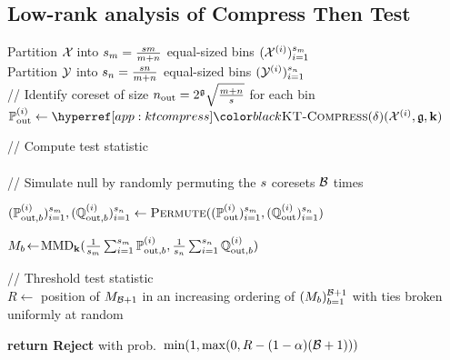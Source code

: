 \subsection{Low-rank analysis of Compress Then Test}
\begin{algorithm2e}[h]
\caption{\cttname (\ctt)}%
\label{algo:ctt}
\SetAlgoLined
  \DontPrintSemicolon
\small{
  \BlankLine
  Partition $\mathcal{X}_{}$ into $s_m =  \frac{s m}{m+n}$ equal-sized bins 
  $ ( \mathcal{X}_{}^{(i)} )_{i=1}^{s_m}$ \\
  Partition $\mathcal{Y}_{}$ into $s_n =  \frac{s n}{m+n}$ equal-sized bins 
  $ ( \mathcal{Y}_{}^{(i)} )_{i=1}^{s_n}$ \\
  
  \BlankLine
  // Identify coreset of size
  $n_{\textup{out}}=2^{\mathfrak{g}}\sqrt{\frac{m+n}{s}}$
  for each bin\\
  {$\distX^{(i)}_{\tout} \leftarrow \ktcompressd( \xs^{(i)}, \ossymb, \k)$}

    \BlankLine
    // Compute \tmmd test statistic \\

 \\[.2\baselineskip]
%
    \BlankLine
    // Simulate null by randomly permuting the $s$ coresets $\mathcal{B}$ times \\ %
    {
    $(\mathbb{P}^{(i)}_{\textup{out},b})_{i=1}^{s_m}, (\mathbb{Q}^{(i)}_{\textup{out},b})_{i=1}^{s_n}\gets \textsc{Permute}((\mathbb{P}^{(i)}_{\textup{out}})_{i=1}^{s_m}, (\mathbb{Q}^{(i)}_{\textup{out}})_{i=1}^{s_n})$
    
    $M_b \!\gets\! 
    \operatorname{MMD}_{\mathbf{k}}(\frac{1}{s_m}\sum_{i=1}^{s_m}\mathbb{P}^{(i)}_{\textup{out},b},\frac{1}{s_n}\sum_{i=1}^{s_n}\mathbb{Q}^{(i)}_{\textup{out},b})$
    }
    
    \BlankLine
    // Threshold test statistic\\
    $R \gets$ position of $M_{\mathcal{B}+1}$ in an increasing ordering of $(M_b)_{b=1}^{\mathcal{B}+1}$ with ties broken uniformly at random
    
    \textbf{return Reject} with prob.\  
        $\min(1, \max(0,R-(1-\alpha)(\mathcal{B}+1)))$}%
\end{algorithm2e}

